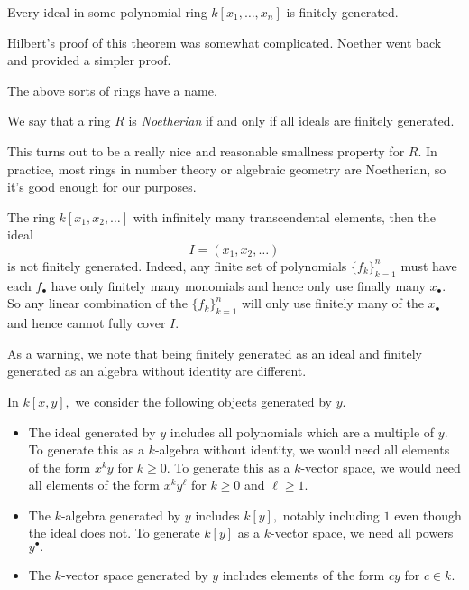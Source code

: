 \documentclass[../notes.tex]{subfiles}
\begin{document}
\begin{theorem}
	Every ideal in some polynomial ring $k[x_1,\ldots,x_n]$ is finitely generated.
\end{theorem}
\begin{remark}
	Hilbert's proof of this theorem was somewhat complicated. Noether went back and provided a simpler proof.
\end{remark}
The above sorts of rings have a name.
\begin{definition}[Noetherian]
	We say that a ring $R$ is \textit{Noetherian} if and only if all ideals are finitely generated.
\end{definition}
This turns out to be a really nice and reasonable smallness property for $R.$ In practice, most rings in number theory or algebraic geometry are Noetherian, so it's good enough for our purposes.
\begin{nex}
	The ring $k[x_1,x_2,\ldots]$ with infinitely many transcendental elements, then the ideal
	\[I=(x_1,x_2,\ldots)\]
	is not finitely generated. Indeed, any finite set of polynomials $\{f_k\}_{k=1}^n$ must have each $f_\bullet$ have only finitely many monomials and hence only use finally many $x_\bullet.$ So any linear combination of the $\{f_k\}_{k=1}^n$ will only use finitely many of the $x_\bullet$ and hence cannot fully cover $I.$
\end{nex}
As a warning, we note that being finitely generated as an ideal and finitely generated as an algebra without identity are different.
\begin{ex}
	In $k[x,y],$ we consider the following objects generated by $y.$ 
	\begin{itemize}
		\item The ideal generated by $y$ includes all polynomials which are a multiple of $y.$ To generate this as a $k$-algebra without identity, we would need all elements of the form $x^ky$ for $k\ge0.$ To generate this as a $k$-vector space, we would need all elements of the form $x^ky^\ell$ for $k\ge0$ and $\ell\ge1.$
		\item The $k$-algebra generated by $y$ includes $k[y],$ notably including $1$ even though the ideal does not. To generate $k[y]$ as a $k$-vector space, we need all powers $y^\bullet.$
		\item The $k$-vector space generated by $y$ includes elements of the form $cy$ for $c\in k.$
	\end{itemize}
\end{ex}
\end{document}
